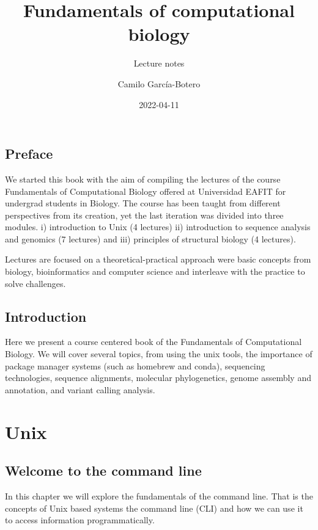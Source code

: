\documentclass[
  letterpaper,
]{scrbook}
\title{Fundamentals of computational biology}
\subtitle{Lecture notes}
\author{Camilo García-Botero}
\date{2022-04-11}
\renewcommand*\contentsname{Table of contents}
\begin{document}
\frontmatter
\maketitle

\renewcommand*\contentsname{Table of contents}
{
\setcounter{tocdepth}{1}
\tableofcontents
}
\mainmatter
\hypertarget{preface}{%
\chapter*{Preface}\label{preface}}

We started this book with the aim of compiling the lectures of the
course Fundamentals of Computational Biology offered at Universidad
EAFIT for undergrad students in Biology. The course has been taught from
different perspectives from its creation, yet the last iteration was
divided into three modules. i) introduction to Unix (4 lectures) ii)
introduction to sequence analysis and genomics (7 lectures) and iii)
principles of structural biology (4 lectures).

Lectures are focused on a theoretical-practical approach were basic
concepts from biology, bioinformatics and computer science and
interleave with the practice to solve challenges.

\hypertarget{introduction}{%
\chapter*{Introduction}\label{introduction}}

Here we present a course centered book of the Fundamentals of
Computational Biology. We will cover several topics, from using the unix
tools, the importance of package manager systems (such as homebrew and
conda), sequencing technologies, sequence alignments, molecular
phylogenetics, genome assembly and annotation, and variant calling
analysis.

\part{Unix}

\hypertarget{welcome-to-the-command-line}{%
\chapter{Welcome to the command
line}\label{welcome-to-the-command-line}}

In this chapter we will explore the fundamentals of the command line.
That is the concepts of Unix based systems the command line (CLI) and
how we can use it to access information programmatically.
\end{document}

